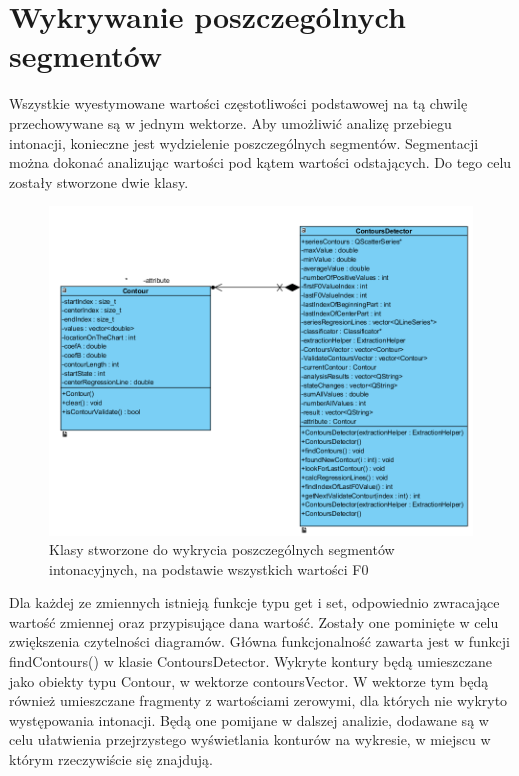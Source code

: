 \documentclass[a4paper,12 pt]{report}
\begin{document}
\section{Wykrywanie poszczególnych segmentów}
Wszystkie wyestymowane wartości częstotliwości podstawowej na tą chwilę przechowywane są w jednym wektorze. Aby umożliwić analizę przebiegu intonacji, konieczne jest wydzielenie poszczególnych segmentów. Segmentacji można dokonać analizując wartości pod kątem wartości odstających.
 Do tego celu zostały stworzone dwie klasy.
 \FloatBarrier
\begin{figure}[h]
\centering
\includegraphics[scale=0.9]{contourDetector.png}
\caption{Klasy stworzone do wykrycia poszczególnych segmentów intonacyjnych, na podstawie wszystkich wartości F0}
\end{figure}
\FloatBarrier
Dla każdej ze zmiennych istnieją funkcje typu get i set, odpowiednio zwracające wartość zmiennej oraz przypisujące dana wartość. Zostały one pominięte w celu zwiększenia czytelności diagramów.
Główna funkcjonalność zawarta jest w funkcji findContours() w klasie ContoursDetector. Wykryte kontury będą umieszczane jako obiekty typu Contour, w wektorze contoursVector. W wektorze tym będą również umieszczane fragmenty z wartościami zerowymi, dla których nie wykryto występowania intonacji. Będą one pomijane w dalszej analizie, dodawane są w celu ułatwienia przejrzystego wyświetlania konturów na wykresie, w miejscu w którym rzeczywiście się znajdują.
\end{document}
